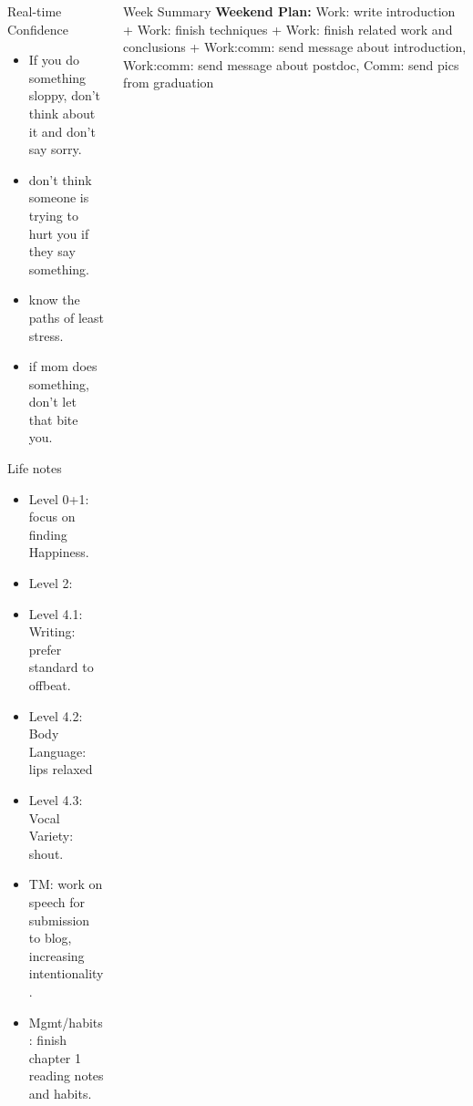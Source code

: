 \documentclass[serif, mathserif, final]{beamer}
\begin{document}
\begin{frame}{}
\begin{columns}
\begin{column}{0.25\linewidth}
      \begin{block}{Real-time Confidence}
        \begin{itemize}
          \tiny \item \tiny If you do something sloppy, don't
          think about it and don't say sorry. 
        \item \tiny don't think someone is trying to hurt you if
          they say something.
        \item \tiny know the paths of least stress. 
        \item \tiny if mom does something, don't let that bite you. 
        \end{itemize}
      \end{block}
      
      \begin{block}{Life notes} 
        \begin{itemize} 
          \tiny \item \tiny Level 0+1: focus on finding Happiness. 
        \item \tiny Level 2: 
        \item \tiny Level 4.1: Writing: prefer standard to offbeat. 
        \item \tiny Level 4.2: Body Language: lips relaxed
        \item \tiny Level 4.3: Vocal Variety: shout. 
        \item \tiny TM: work on speech for submission to blog, increasing intentionality. 
        \item \tiny Mgmt/habits: finish chapter 1 reading notes and habits. 
        \end{itemize}     
      \end{block}
    \end{column} %
    
    \begin{column}{0.50\linewidth}
      \begin{block}{Week Summary}
    {\tiny \textbf{Weekend Plan:} Work: write introduction + Work:
      finish techniques + Work: finish related work and conclusions +
      Work:comm: send message about introduction, Work:comm: send
      message about postdoc, Comm: send pics from graduation }\\
      \end{block}
      

\end{column}
\end{columns}
\end{frame}
\end{document}
